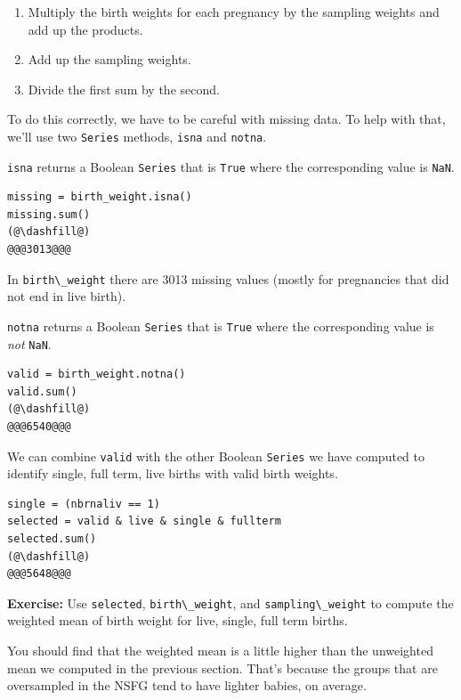 \begin{enumerate}
\def\labelenumi{\arabic{enumi}.}
\item
  Multiply the birth weights for each pregnancy by the sampling weights
  and add up the products.
\item
  Add up the sampling weights.
\item
  Divide the first sum by the second.
\end{enumerate}

To do this correctly, we have to be careful with missing data. To help
with that, we'll use two \passthrough{\lstinline!Series!} methods,
\passthrough{\lstinline!isna!} and \passthrough{\lstinline!notna!}.

\passthrough{\lstinline!isna!} returns a Boolean
\passthrough{\lstinline!Series!} that is \passthrough{\lstinline!True!}
where the corresponding value is \passthrough{\lstinline!NaN!}.

\begin{lstlisting}[]
missing = birth_weight.isna()
missing.sum()
(@\dashfill@)
@@@3013@@@
\end{lstlisting}

In \passthrough{\lstinline!birth\_weight!} there are 3013 missing values
(mostly for pregnancies that did not end in live birth).

\passthrough{\lstinline!notna!} returns a Boolean
\passthrough{\lstinline!Series!} that is \passthrough{\lstinline!True!}
where the corresponding value is \emph{not}
\passthrough{\lstinline!NaN!}.

\begin{lstlisting}[]
valid = birth_weight.notna()
valid.sum()
(@\dashfill@)
@@@6540@@@
\end{lstlisting}

We can combine \passthrough{\lstinline!valid!} with the other Boolean
\passthrough{\lstinline!Series!} we have computed to identify single,
full term, live births with valid birth weights.

\begin{lstlisting}[]
single = (nbrnaliv == 1)
selected = valid & live & single & fullterm
selected.sum()
(@\dashfill@)
@@@5648@@@
\end{lstlisting}

\textbf{Exercise:} Use \passthrough{\lstinline!selected!},
\passthrough{\lstinline!birth\_weight!}, and
\passthrough{\lstinline!sampling\_weight!} to compute the weighted mean
of birth weight for live, single, full term births.

You should find that the weighted mean is a little higher than the
unweighted mean we computed in the previous section. That's because the
groups that are oversampled in the NSFG tend to have lighter babies, on
average.

